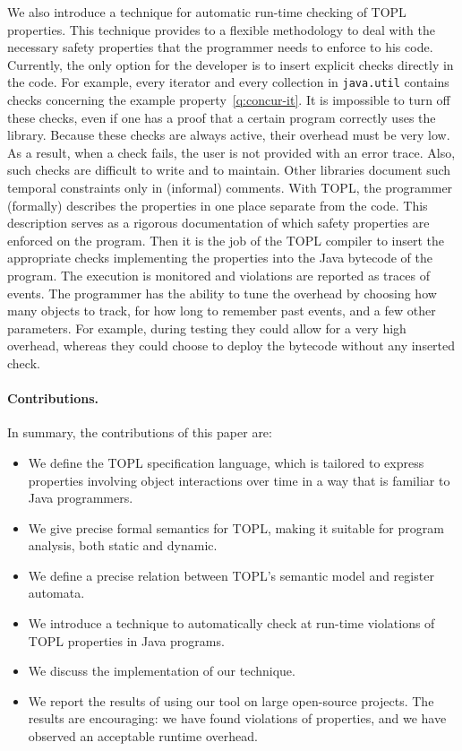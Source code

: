 \documentclass[10pt, preprint]{sigplanconf} %
\begin{document}
We also introduce a technique for automatic run-time checking of TOPL properties.
This technique provides to a flexible methodology to deal with the necessary safety properties that the programmer needs to enforce to his code. 
Currently, the only option for the developer is to insert explicit checks directly in the code.
For example, every iterator and every collection in \texttt{java.util} contains checks concerning the example property~\eqref{q:concur-it}.
It is impossible to turn off these checks, even if one has a proof that a certain program correctly uses the library.
Because these checks are always active, their overhead must be very low.
As a result, when a check fails, the user is not provided with an error trace.
Also, such checks are difficult to write and to maintain.
Other libraries document such temporal constraints only in (informal) comments.
With TOPL, the programmer (formally) describes the properties in one place separate from the code. 
This description serves as a rigorous documentation of which safety properties are enforced on the program.
Then it is the job of the TOPL compiler to insert the appropriate checks implementing the properties into the Java bytecode of the program.
The execution is monitored and violations are reported as traces of events.
The programmer has the ability to tune the overhead by choosing how many objects to track, for how long to remember past events, and a few other parameters.
For example, during testing they could allow for a very high overhead, whereas they could choose to deploy the bytecode without any inserted check.

\paragraph{Contributions.}
In summary, the contributions of this paper are:
\begin{itemize}
\item We define the TOPL specification language, which is tailored to express properties involving object interactions over time in a way that is familiar to Java programmers.
\item We give precise formal semantics for TOPL, making it suitable for program analysis, both static and dynamic.
\item We define a precise relation between TOPL's semantic model and register automata. 
\item We introduce a technique to automatically check at run-time violations of TOPL properties in Java programs.

\item We discuss the implementation of our technique.
\item We report the results of using our tool on large open-source projects. The results are encouraging: we have found
violations of properties, and we have observed an acceptable runtime overhead. 
\end{itemize}
\end{document}
